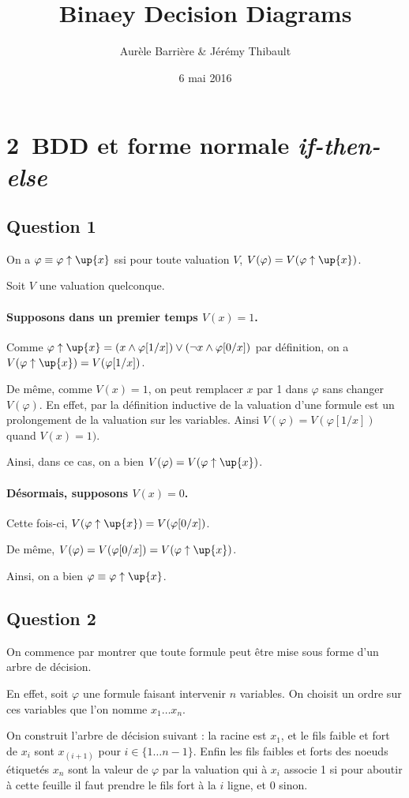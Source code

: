 \documentclass[12pt]{article}
\title{Binaey Decision Diagrams}
\author{Aurèle Barrière \& Jérémy Thibault}
\date{6 mai 2016}
\def\question#1{\subsection*{Question #1}}
\def\phix{\varphi\uparrow\up{x}}
\def\ite{\textit{if-then-else}}
\begin{document}
\maketitle

\section*{2\ BDD et forme normale \ite}

\question{1}

On a $\varphi\equiv\phix$ ssi pour toute valuation $V$, $V(\varphi) = V(\phix)$.

Soit $V$ une valuation quelconque. 

\paragraph{Supposons dans un premier temps $V(x) = 1$.} Comme $\phix = (x \wedge\varphi[1/x])\vee(\neg x\wedge\varphi[0/x])$ par définition, on a $V(\phix) = V(\varphi[1/x])$.

De même, comme $V(x) = 1$, on peut remplacer $x$ par 1 dans $\varphi$ sans changer $V(\varphi)$. En effet, par la définition inductive de la valuation d'une formule est un prolongement de la valuation sur les variables. Ainsi $V(\varphi)=V(\varphi[1/x])$ quand $V(x)=1)$.

Ainsi, dans ce cas, on a bien $V(\varphi) = V(\phix)$.

\paragraph{Désormais, supposons $V(x)=0$.} Cette fois-ci, $V(\phix) = V(\varphi[0/x])$.

De même, $V(\varphi) =  V(\varphi[0/x]) = V(\phix)$.

Ainsi, on a bien $\varphi\equiv\phix$.

\question{2}

On commence par montrer que toute formule peut être mise sous forme d'un arbre de décision.

En effet, soit $\varphi$ une formule faisant intervenir $n$ variables. On choisit un ordre sur ces variables que l'on nomme $x_1\dots x_n$.

On construit l'arbre de décision suivant : la racine est $x_1$, et le fils faible et fort de $x_i$ sont $x_{(i+1)}$ pour $i\in\{1\dots n-1\}$. Enfin les fils faibles et forts des noeuds étiquetés $x_n$ sont la valeur de $\varphi$ par la valuation qui à $x_i$ associe 1 si pour aboutir à cette feuille il faut prendre le fils fort à la $i$ ligne, et 0 sinon.
\end{document}
